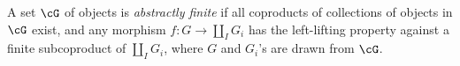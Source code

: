 \documentclass{amsart}
\begin{document}
\begin{defn}
  A set $\cG$ of objects is \emph{abstractly finite} if all coproducts of collections of objects in $\cG$ exist, and any morphism $f : G \to \coprod_{I}G_{i}$ has the left-lifting property against a finite subcoproduct of $\coprod_{I}G_{i}$, where $G$ and $G_{i}$'s are drawn from $\cG$.
\end{defn}



\end{document}
